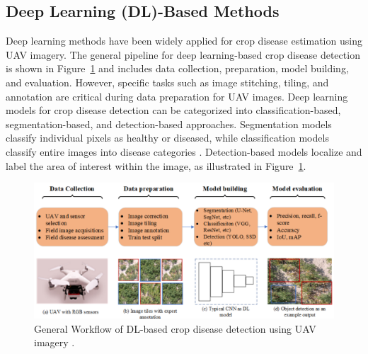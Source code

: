 \begin{table}[h]
    \centering
    \caption{Summary of conventional ML methods for wheat disease estimation.}
    \label{tab:summaryML}
\end{table}


\subsection{Deep Learning (DL)-Based Methods}

Deep learning methods have been widely applied for crop disease estimation using UAV imagery. The general pipeline for deep learning-based crop disease detection is shown in Figure~\ref{fig:DLBased} and includes data collection, preparation, model building, and evaluation. However, specific tasks such as image stitching, tiling, and annotation are critical during data preparation for UAV images. Deep learning models for crop disease detection can be categorized into classification-based, segmentation-based, and detection-based approaches. Segmentation models classify individual pixels as healthy or diseased, while classification models classify entire images into disease categories \parencite{shahi2023recent}. Detection-based models localize and label the area of interest within the image, as illustrated in Figure~\ref{fig:DLBased}.

\begin{figure}[H]
    \centering
    \includegraphics[width=0.8
    \textwidth]{chapters/chapter3/images/Figure09.png}
    \caption{General Workflow of DL-based crop disease detection using UAV imagery \parencite{shahi2023recent}.}
    \label{fig:DLBased}
\end{figure}

